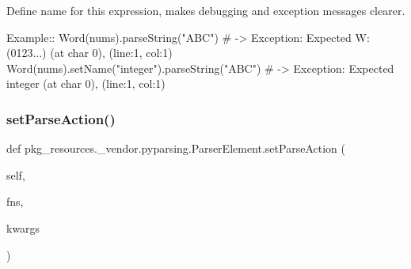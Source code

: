 \begin{DoxyVerb}Define name for this expression, makes debugging and exception messages clearer.

Example::
    Word(nums).parseString("ABC")  # -> Exception: Expected W:(0123...) (at char 0), (line:1, col:1)
    Word(nums).setName("integer").parseString("ABC")  # -> Exception: Expected integer (at char 0), (line:1, col:1)
\end{DoxyVerb}
 \mbox{\label{classpkg__resources_1_1__vendor_1_1pyparsing_1_1ParserElement_a4fc9391373f5434729bec5a5440a2788}} 
\subsubsection{\texorpdfstring{set\+Parse\+Action()}{setParseAction()}}
{\footnotesize\ttfamily def pkg\+\_\+resources.\+\_\+vendor.\+pyparsing.\+Parser\+Element.\+set\+Parse\+Action (\begin{DoxyParamCaption}\item[{}]{self,  }\item[{}]{fns,  }\item[{}]{kwargs }\end{DoxyParamCaption})}

